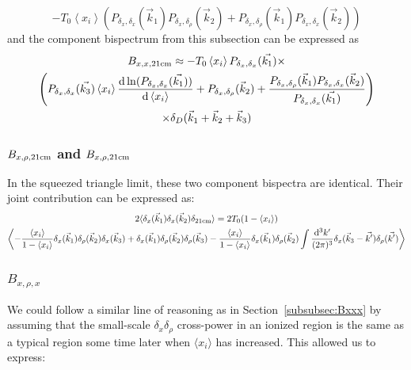 \begin{equation}
-T_0 \left\langle x_i \right\rangle \left(P_{\delta_x, \delta_x}(\vec{k}_1) P_{\delta_x, \delta_{\rho}}(\vec{k}_2)  + P_{\delta_x, \delta_{\rho}}(\vec{k}_1) P_{\delta_x, \delta_x}(\vec{k}_2)  \right)
\end{equation}
and the component bispectrum from this subsection can be expressed as
\begin{multline}
B_{x,x,{\rm 21cm}} \approx 
 - T_0 \left\langle x_i \right\rangle P_{\delta_x,\delta_x}(\vec{k_1}) \times \\
\left(
P_{\delta_x,\delta_x}(\vec{k_3}) \left\langle x_i \right\rangle \frac{{\rm d} \ln (P_{\delta_x,\delta_x}(\vec{k_1}))}{{\rm d}\left\langle x_i \right\rangle} 
+ P_{\delta_x, \delta_{\rho}}(\vec{k}_2)  +\frac{ P_{\delta_x, \delta_{\rho}}(\vec{k}_1)P_{\delta_x, \delta_x}(\vec{k}_2)}{P_{\delta_x,\delta_x}(\vec{k_1}) } 
\right) \\
\times \delta_D(\vec{k}_1+\vec{k}_2+\vec{k}_3)
\end{multline}

\subsubsection{$B_{x,\rho,{\rm 21cm}}$ and $B_{x,\rho,{\rm 21cm}}$}
\label{subsec:B_xrho21}

In the squeezed triangle limit, these two component bispectra are identical. Their joint contribution can be expressed as:
\begin{multline}
2\langle \delta_x(\vec{k}_1) \delta_x(\vec{k}_2) \delta_{{\rm 21cm}}\rangle = 
2T_0(1-\left\langle x_i \right\rangle) \\ \left\langle 
- \frac{\left\langle x_i \right\rangle}{1-\left\langle x_i \right\rangle} \delta_x(\vec{k}_1) \delta_{\rho}(\vec{k}_2) \delta_x(\vec{k}_3)
+ \delta_x(\vec{k}_1) \delta_{\rho}(\vec{k}_2) \delta_{\rho}(\vec{k}_3)
- \frac{\left\langle x_i \right\rangle}{1-\left\langle x_i \right\rangle} \delta_x(\vec{k}_1) \delta_{\rho}(\vec{k}_2) \int \frac{{\rm d^3}k'}{(2\pi)^3} \delta_x(\vec{k}_3 - \vec{k'})\delta_{\rho}(\vec{k'})\right\rangle
\end{multline}

\subsubsection*{$B_{x,\rho,x}$}
\label{subsubsec:Bxrhox}
We could follow a similar line of reasoning as in Section~\ref{subsubsec:Bxxx} by assuming that the small-scale $\delta_x\delta_{\rho}$ cross-power in an ionized region is the same as a typical region some time later when $\langle x_i \rangle$ has increased. This allowed us to express:

